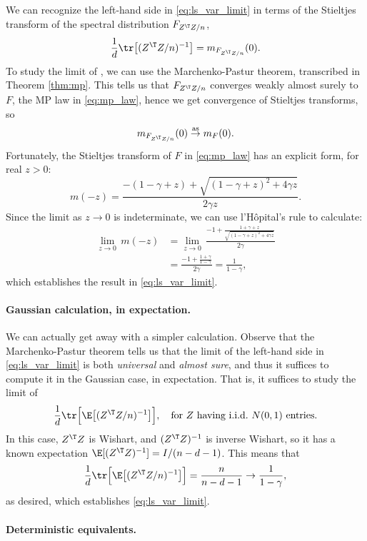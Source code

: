 \documentclass{article}
\begin{document}
We can recognize the left-hand side in \eqref{eq:ls_var_limit} in terms of the
Stieltjes transform of the spectral distribution $F_{Z^\T Z/n}$,  
\[
\frac{1}{d} \tr \big[ (Z^\T Z/n)^{-1} \big] = m_{F_{Z^\T Z/n}}(0).
\]
To study the limit of , we can use the
Marchenko-Pastur theorem, transcribed in Theorem \ref{thm:mp}. This tells us
that $F_{Z^\T Z/n}$ converges weakly almost surely to $F$, the MP law in
\eqref{eq:mp_law}, hence we get convergence of Stieltjes transforms, so     
\[
m_{F_{Z^\T Z/n}}(0) \asto m_F(0).
\]
Fortunately, the Stieltjes transform of $F$ in \eqref{eq:mp_law} has an explicit
form, for real $z>0$:    
\begin{equation}
\label{eq:mp_stieltjes}
m(-z) = \frac{-(1 - \gamma + z) + \sqrt{(1 - \gamma + z)^2 + 4 \gamma z}}{2
  \gamma z}. 
\end{equation}
Since the limit as $z \to 0$ is indeterminate, we can use l'H{\^o}pital's rule
to calculate:   
\begin{align*}
\lim_{z \to 0} \, m(-z) 
&= \lim_{z \to 0} \, \frac{-1 + \frac{1+\gamma+z}
  {\sqrt{(1-\gamma+z)^2 + 4\gamma z}}}{2\gamma} \\
&= \frac{-1+\frac{1+\gamma}{1-\gamma}}{2\gamma} 
= \frac{1}{1-\gamma},
\end{align*}
which establishes the result in \eqref{eq:ls_var_limit}. 

\paragraph{Gaussian calculation, in expectation.} 

We can actually get away with a simpler calculation. Observe that the
Marchenko-Pastur theorem tells us that the limit of the left-hand side in
\eqref{eq:ls_var_limit} is both \emph{universal} and \emph{almost sure}, and
thus it suffices to compute it in the Gaussian case, in expectation. That is, it 
suffices to study the limit of
\[
\frac{1}{d} \tr \Big[ \E\big[ (Z^\T Z/n)^{-1} \big] \Big], \quad \text{for $Z$ 
  having i.i.d.\ $N(0,1)$ entries.}
\]
In this case, $Z^\T Z$ is Wishart, and $(Z^\T Z)^{-1}$ is inverse Wishart, so it
has a known expectation $\E[(Z^\T Z)^{-1}] = I/(n-d-1)$. This means that
\[
\frac{1}{d} \tr \Big[ \E\big[ (Z^\T Z/n)^{-1} \big] \Big] = \frac{n}{n-d-1} \to
\frac{1}{1-\gamma}, 
\]
as desired, which establishes \eqref{eq:ls_var_limit}.

\paragraph{Deterministic equivalents.}
\end{document}
